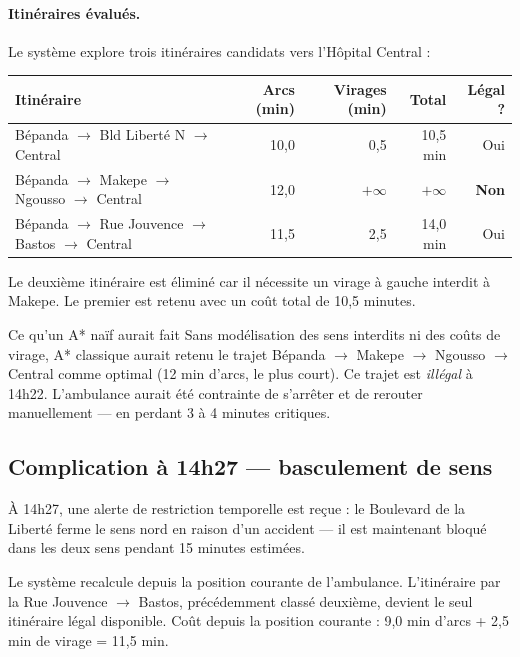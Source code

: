 \documentclass[12pt,a4paper]{article}
\theoremstyle{definition}
\theoremstyle{remark}
\begin{document}
\paragraph{Itinéraires évalués.}
Le système explore trois itinéraires candidats vers l'Hôpital Central :

\begin{center}
\begin{tabular}{lrrrr}
  \toprule
  \textbf{Itinéraire} & \textbf{Arcs (min)} & \textbf{Virages (min)} & \textbf{Total} & \textbf{Légal ?} \\
  \midrule
  Bépanda $\to$ Bld Liberté N $\to$ Central       & 10,0 & 0,5 & 10,5 min & Oui \\
  Bépanda $\to$ Makepe $\to$ Ngousso $\to$ Central & 12,0 & $+\infty$ & $+\infty$ & \textbf{Non} \\
  Bépanda $\to$ Rue Jouvence $\to$ Bastos $\to$ Central & 11,5 & 2,5 & 14,0 min & Oui \\
  \bottomrule
\end{tabular}
\end{center}

Le deuxième itinéraire est éliminé car il nécessite un virage à gauche
interdit à Makepe. Le premier est retenu avec un coût total de 10,5 minutes.

\begin{alertbox}{Ce qu'un A* naïf aurait fait}
Sans modélisation des sens interdits ni des coûts de virage, A* classique
aurait retenu le trajet Bépanda $\to$ Makepe $\to$ Ngousso $\to$ Central
comme optimal (12 min d'arcs, le plus court). Ce trajet est \emph{illégal}
à 14h22. L'ambulance aurait été contrainte de s'arrêter et de rerouter
manuellement — en perdant 3 à 4 minutes critiques.
\end{alertbox}

\subsection{Complication à 14h27 — basculement de sens}

À 14h27, une alerte de restriction temporelle est reçue :
le Boulevard de la Liberté ferme le sens nord en raison d'un accident
— il est maintenant bloqué dans les deux sens pendant 15 minutes estimées.

Le système recalcule depuis la position courante de l'ambulance.
L'itinéraire par la Rue Jouvence $\to$ Bastos, précédemment classé
deuxième, devient le seul itinéraire légal disponible. Coût depuis
la position courante : 9,0 min d'arcs + 2,5 min de virage = 11,5 min.
\end{document}

